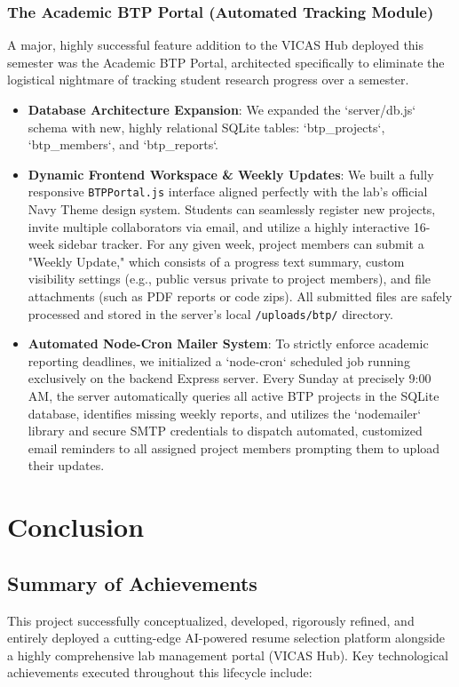 \documentclass[12pt,a4paper]{report}
\begin{document}
\subsection{The Academic BTP Portal (Automated Tracking Module)}
A major, highly successful feature addition to the VICAS Hub deployed this semester was the Academic BTP Portal, architected specifically to eliminate the logistical nightmare of tracking student research progress over a semester.
\begin{itemize}
    \item \textbf{Database Architecture Expansion}: We expanded the `server/db.js` schema with new, highly relational SQLite tables: `btp\_projects`, `btp\_members`, and `btp\_reports`.
    \item \textbf{Dynamic Frontend Workspace \& Weekly Updates}: We built a fully responsive \texttt{BTPPortal.js} interface aligned perfectly with the lab's official Navy Theme design system. Students can seamlessly register new projects, invite multiple collaborators via email, and utilize a highly interactive 16-week sidebar tracker. For any given week, project members can submit a "Weekly Update," which consists of a progress text summary, custom visibility settings (e.g., public versus private to project members), and file attachments (such as PDF reports or code zips). All submitted files are safely processed and stored in the server's local \texttt{/uploads/btp/} directory.
    \item \textbf{Automated Node-Cron Mailer System}: To strictly enforce academic reporting deadlines, we initialized a `node-cron` scheduled job running exclusively on the backend Express server. Every Sunday at precisely 9:00 AM, the server automatically queries all active BTP projects in the SQLite database, identifies missing weekly reports, and utilizes the `nodemailer` library and secure SMTP credentials to dispatch automated, customized email reminders to all assigned project members prompting them to upload their updates.
\end{itemize}

\chapter{Conclusion}

\section{Summary of Achievements}

This project successfully conceptualized, developed, rigorously refined, and entirely deployed a cutting-edge AI-powered resume selection platform alongside a highly comprehensive lab management portal (VICAS Hub). Key technological achievements executed throughout this lifecycle include:
\end{document}
